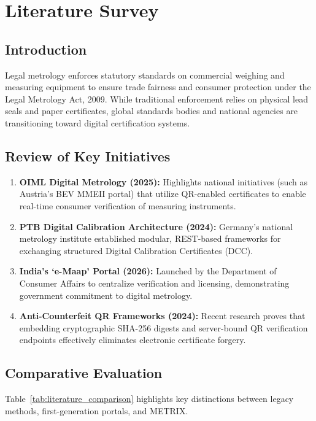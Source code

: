 \chapter{Literature Survey}

\section{Introduction}
Legal metrology enforces statutory standards on commercial weighing and measuring equipment to ensure trade fairness and consumer protection under the Legal Metrology Act, 2009. While traditional enforcement relies on physical lead seals and paper certificates, global standards bodies and national agencies are transitioning toward digital certification systems.

\section{Review of Key Initiatives}
\begin{enumerate}
    \item \textbf{OIML Digital Metrology (2025):} Highlights national initiatives (such as Austria's BEV MMEII portal) that utilize QR-enabled certificates to enable real-time consumer verification of measuring instruments.
    \item \textbf{PTB Digital Calibration Architecture (2024):} Germany's national metrology institute established modular, REST-based frameworks for exchanging structured Digital Calibration Certificates (DCC).
    \item \textbf{India's `e-Maap' Portal (2026):} Launched by the Department of Consumer Affairs to centralize verification and licensing, demonstrating government commitment to digital metrology.
    \item \textbf{Anti-Counterfeit QR Frameworks (2024):} Recent research proves that embedding cryptographic SHA-256 digests and server-bound QR verification endpoints effectively eliminates electronic certificate forgery.
\end{enumerate}

\section{Comparative Evaluation}
Table~\ref{tab:literature_comparison} highlights key distinctions between legacy methods, first-generation portals, and METRIX.

